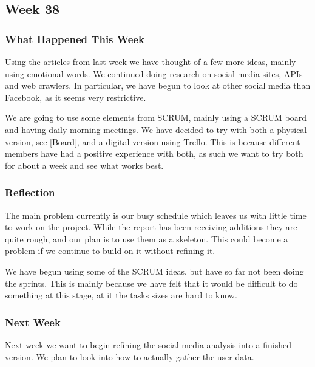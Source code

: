 \subsection{Week 38} 
\subsubsection{What Happened This Week} 
Using the articles from last week we have thought of a few more ideas, mainly
using emotional words. We continued doing research on social media sites, APIs
and web crawlers. In particular, we have begun to look at other social media
than Facebook, as it seems very restrictive.\nl

We are going to use some elements from SCRUM, mainly using a SCRUM board and
having daily morning meetings. We have decided to try with both a physical
version, see \autoref{Board}, and a digital version using Trello. This is
because different members have had a positive experience with both, as such we
want to try both for about a week and see what works best. 


\subsubsection{Reflection}
The main problem currently is our busy schedule which leaves us with little time
to work on the project. While the report has been receiving additions they are
quite rough, and our plan is to use them as a skeleton. This could become a
problem if we continue to build on it without refining it.\nl

We have begun using some of the SCRUM ideas, but have so far not been doing the
sprints. This is mainly because we have felt that it would be difficult to do
something at this stage, at it the tasks sizes are hard to know.

\subsubsection{Next Week}
Next week we want to begin refining the social media analysis into a finished
version. We plan to look into how to actually gather the user data.






